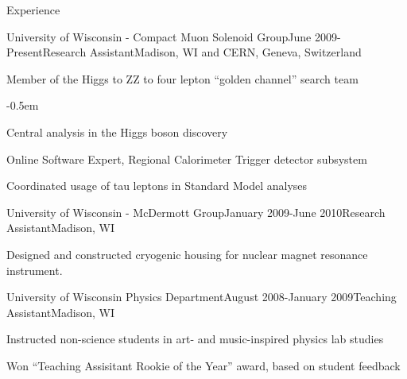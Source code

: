 \documentclass{resume} %
\begin{document}
\begin{rSection}{Experience}
\begin{rSubsection}{University of Wisconsin - Compact Muon Solenoid Group}{June
2009-Present}{Research Assistant}{Madison, WI and CERN, Geneva, Switzerland}
\item Member of the Higgs to ZZ to four lepton ``golden channel'' search team
    \begin{list}{}{\leftmargin=1.5em} 
      \itemsep -0.5em \vspace{-0.5em} %
      \item Central analysis in the Higgs boson discovery
    \end{list}

\item Online Software Expert, Regional Calorimeter Trigger detector subsystem

\item Coordinated usage of tau leptons in Standard Model analyses

\end{rSubsection}

\begin{rSubsection}{University of Wisconsin - McDermott Group}{January 2009-June 2010}{Research Assistant}{Madison, WI}
\item Designed and constructed cryogenic housing for nuclear magnet
    resonance instrument.
\end{rSubsection}

\begin{rSubsection}{University of Wisconsin Physics Department}{August
2008-January 2009}{Teaching Assistant}{Madison, WI}
\item Instructed non-science students in art- and music-inspired physics
    lab studies
\item Won ``Teaching Assisitant Rookie of the Year'' award, based on
    student feedback
\end{rSubsection}



\end{rSection}

\end{document}
